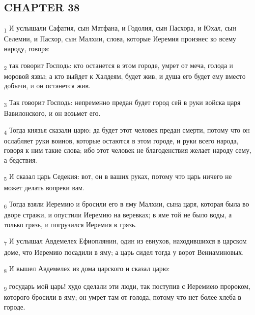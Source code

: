 \subsection{CHAPTER 38}
\begin{tcolorbox}
\textsubscript{1} И услышали Сафатия, сын Матфана, и Годолия, сын Пасхора, и Юхал, сын Селемии, и Пасхор, сын Малхии, слова, которые Иеремия произнес ко всему народу, говоря:
\end{tcolorbox}
\begin{tcolorbox}
\textsubscript{2} так говорит Господь: кто останется в этом городе, умрет от меча, голода и моровой язвы; а кто выйдет к Халдеям, будет жив, и душа его будет ему вместо добычи, и он останется жив.
\end{tcolorbox}
\begin{tcolorbox}
\textsubscript{3} Так говорит Господь: непременно предан будет город сей в руки войска царя Вавилонского, и он возьмет его.
\end{tcolorbox}
\begin{tcolorbox}
\textsubscript{4} Тогда князья сказали царю: да будет этот человек предан смерти, потому что он ослабляет руки воинов, которые остаются в этом городе, и руки всего народа, говоря к ним такие слова; ибо этот человек не благоденствия желает народу сему, а бедствия.
\end{tcolorbox}
\begin{tcolorbox}
\textsubscript{5} И сказал царь Седекия: вот, он в ваших руках, потому что царь ничего не может делать вопреки вам.
\end{tcolorbox}
\begin{tcolorbox}
\textsubscript{6} Тогда взяли Иеремию и бросили его в яму Малхии, сына царя, которая была во дворе стражи, и опустили Иеремию на веревках; в яме той не было воды, а только грязь, и погрузился Иеремия в грязь.
\end{tcolorbox}
\begin{tcolorbox}
\textsubscript{7} И услышал Авдемелех Ефиоплянин, один из евнухов, находившихся в царском доме, что Иеремию посадили в яму; а царь сидел тогда у ворот Вениаминовых.
\end{tcolorbox}
\begin{tcolorbox}
\textsubscript{8} И вышел Авдемелех из дома царского и сказал царю:
\end{tcolorbox}
\begin{tcolorbox}
\textsubscript{9} государь мой царь! худо сделали эти люди, так поступив с Иеремиею пророком, которого бросили в яму; он умрет там от голода, потому что нет более хлеба в городе.
\end{tcolorbox}
